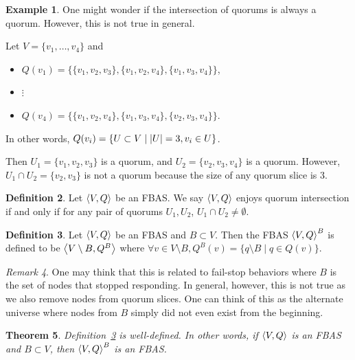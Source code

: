 \documentclass[12pt, psamsfonts]{amsart}
\newtheorem{thm}{Theorem}[section]
\theoremstyle{definition}
\newtheorem{defn}[thm]{Definition}
\newtheorem{exmp}[thm]{Example}
\theoremstyle{remark}
\newtheorem{rem}[thm]{Remark}
\numberwithin{equation}{section}
\begin{document}
\begin{exmp}
    One might wonder if the intersection of quorums is always a quorum.
    However, this is not true in general.

    Let $V = \{ v_1, \ldots, v_4 \}$ and
    \begin{itemize}
        \item
            $Q(v_1) = \{ \{ v_1, v_2, v_3 \}, \{ v_1, v_2, v_4 \}, \{ v_1, v_3, v_4 \} \}$,
        \item
            $\vdots$
        \item
            $Q(v_4) = \{ \{ v_1, v_2, v_4 \}, \{ v_1, v_3, v_4 \}, \{ v_2, v_3, v_4 \} \}$.
    \end{itemize}

    In other words, $Q(v_i) = \{ U \subset V \mid \abs{U} = 3, v_i \in U \}$.

    Then $U_1 = \{ v_1, v_2, v_3 \}$ is a quorum, and $U_2 = \{ v_2, v_3, v_4 \}$ is a quorum.
    However, $U_1 \cap U_2 = \{ v_2, v_3 \}$ is not a quorum because the size of any quorum slice is 3.
\end{exmp}

\begin{defn}
    Let $\ev{V, Q}$ be an FBAS\@.
    We say $\ev{V, Q}$ enjoys quorum intersection if and only if for any pair of quorums $U_1, U_2$, $U_1 \cap U_2 \ne \emptyset$.
\end{defn}

\begin{defn}\label{delete_fbas}
    Let $\ev{V, Q}$ be an FBAS and $B \subset V$.
    Then the FBAS $\ev{V, Q}^B$ is defined to be $\ev{V \setminus B, Q^B}$ where $\forall v \in V \setminus B, Q^B(v) = \{ q \setminus B \mid q \in Q(v) \}$.
\end{defn}

\begin{rem}
    One may think that this is related to fail-stop behaviors where $B$ is the set of nodes that stopped responding.
    In general, however, this is not true as we also remove nodes from quorum slices.
    One can think of this as the alternate universe where nodes from $B$ simply did not even exist from the beginning.
\end{rem}

\begin{thm}
    Definition~\ref{delete_fbas} is well-defined.
    In other words, if $\ev{V, Q}$ is an FBAS and $B \subset V$, then $\ev{V, Q}^B$ is an FBAS\@.
\end{thm}
\end{document}
